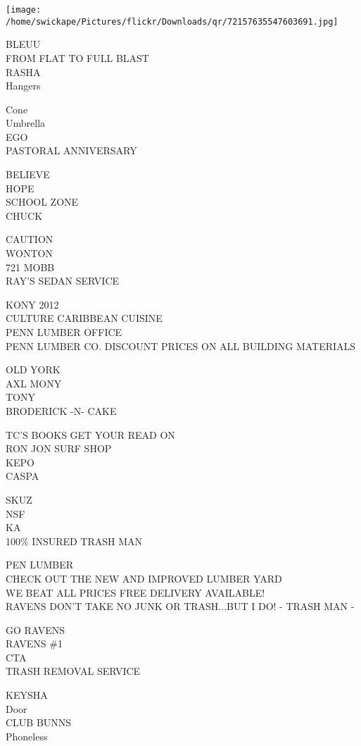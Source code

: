 \documentclass[10pt,letterpaper]{article}
\begin{document}
\texttt{[image: /home/swickape/Pictures/flickr/Downloads/qr/72157635547603691.jpg]}


BLEUU\\
FROM FLAT TO FULL BLAST\\
RASHA\\
Hangers

Cone\\
Umbrella\\
EGO\\
PASTORAL ANNIVERSARY

BELIEVE\\
HOPE\\
SCHOOL ZONE\\
CHUCK

CAUTION\\
WONTON\\
721 MOBB\\
RAY'S SEDAN SERVICE

KONY 2012\\
CULTURE CARIBBEAN CUISINE\\
PENN LUMBER OFFICE\\
PENN LUMBER CO. DISCOUNT PRICES ON ALL BUILDING MATERIALS

OLD YORK\\
AXL MONY\\
TONY\\
BRODERICK {-}N{-} CAKE

TC'S BOOKS GET YOUR READ ON\\
RON JON SURF SHOP\\
KEPO\\
CASPA

SKUZ\\
NSF\\
KA\\
100\% INSURED TRASH MAN

PEN LUMBER\\
CHECK OUT THE NEW AND IMPROVED LUMBER YARD\\
WE BEAT ALL PRICES FREE DELIVERY AVAILABLE!\\
RAVENS DON'T TAKE NO JUNK OR TRASH...BUT I DO!  {-} TRASH MAN {-}

GO RAVENS\\
RAVENS \#1\\
CTA\\
TRASH REMOVAL SERVICE

KEYSHA\\
Door\\
CLUB BUNNS\\
Phoneless
\end{document}

